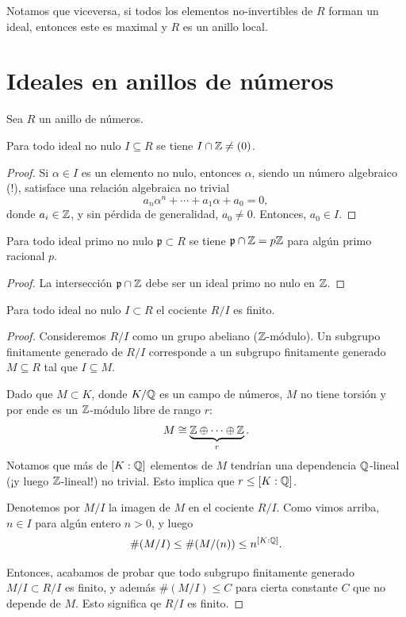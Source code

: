 Notamos que viceversa, si todos los elementos no-invertibles de $R$ forman un
ideal, entonces este es maximal y $R$ es un anillo local.
\fi


\section{Ideales en anillos de números}

Sea $R$ un anillo de números.

\begin{lema}
  Para todo ideal no nulo $I \subseteq R$ se tiene $I \cap \mathbb{Z} \ne (0)$.

  \begin{proof}
    Si $\alpha \in I$ es un elemento no nulo, entonces $\alpha$, siendo un
    número algebraico (!), satisface una relación algebraica no trivial
    $$a_n \alpha^n + \cdots + a_1 \alpha + a_0 = 0,$$
    donde $a_i \in \mathbb{Z}$, y sin pérdida de generalidad, $a_0 \ne 0$. Entonces,
    $a_0 \in I$.
  \end{proof}
\end{lema}

\begin{corolario}
  Para todo ideal primo no nulo $\mathfrak{p} \subset R$ se tiene
  $\mathfrak{p} \cap \mathbb{Z} = p\mathbb{Z}$ para algún primo racional $p$.

  \begin{proof}
    La intersección $\mathfrak{p} \cap \mathbb{Z}$ debe ser un ideal primo no nulo en
    $\mathbb{Z}$.
  \end{proof}
\end{corolario}

\begin{teorema}
  \label{thm:R/I-finito}
  Para todo ideal no nulo $I \subset R$ el cociente $R/I$ es finito.

  \begin{proof}
    Consideremos $R/I$ como un grupo abeliano ($\mathbb{Z}$-módulo). Un subgrupo
    finitamente generado de $R/I$ corresponde a un subgrupo finitamente generado
    $M \subseteq R$ tal que $I \subseteq M$.

    Dado que $M \subset K$, donde $K/\mathbb{Q}$ es un campo de números, $M$ no tiene
    torsión y por ende es un $\mathbb{Z}$-módulo libre de rango $r$:
    $$M \cong \underbrace{\mathbb{Z}\oplus\cdots\oplus\mathbb{Z}}_r.$$
    Notamos que más de $[K : \mathbb{Q}]$ elementos de $M$ tendrían una dependencia
    $\mathbb{Q}$-lineal (¡y luego $\mathbb{Z}$-lineal!) no trivial.  Esto implica que
    $r \le [K : \mathbb{Q}]$.

    Denotemos por $M/I$ la imagen de $M$ en el cociente $R/I$.
    Como vimos arriba, $n \in I$ para algún entero $n > 0$, y luego
    $$\# (M/I) \le \# (M/(n)) \le n^{[K : \mathbb{Q}]}.$$

    Entonces, acabamos de probar que todo subgrupo finitamente generado
    $M/I \subset R/I$ es finito, y además $\# (M/I) \le C$ para cierta constante
    $C$ que no depende de $M$. Esto significa qe $R/I$ es finito.
  \end{proof}
\end{teorema}

